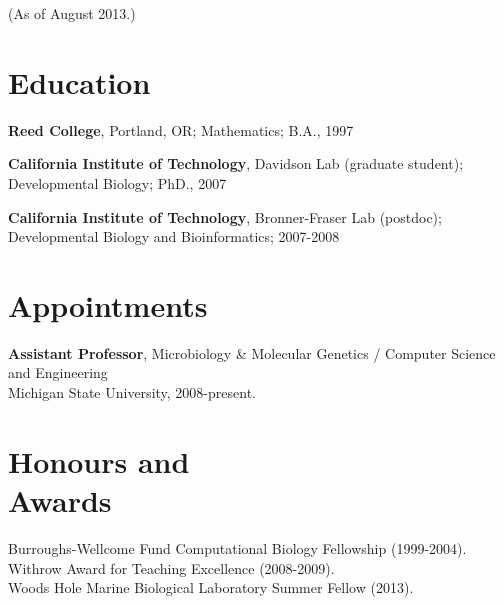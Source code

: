 \documentclass[margin,line]{resume}
\begin{document}


\begin{resume}



    {\small (As of August 2013.)}

    \section{\mysidestyle Education}

    {\bf Reed College}, Portland, OR; Mathematics; B.A., 1997

    \vspace{2mm}

    {\bf California Institute of Technology}, Davidson Lab (graduate student);
\\
Developmental Biology; PhD., 2007

    \vspace{2mm}

    {\bf California Institute of Technology}, Bronner-Fraser Lab (postdoc);\\
 Developmental Biology and Bioinformatics; 2007-2008

    \vspace{2mm}

    \section{\mysidestyle Appointments}

    {\bf Assistant Professor}, 
Microbiology \& Molecular Genetics / Computer Science and Engineering\\
Michigan State University, 2008-present.

    \section{\mysidestyle Honours and\\Awards} 

Burroughs-Wellcome Fund Computational Biology Fellowship (1999-2004).\\
Withrow Award for Teaching Excellence (2008-2009). \\
Woods Hole Marine Biological Laboratory Summer Fellow (2013).


\end{resume}
\end{document}
